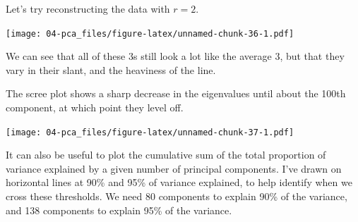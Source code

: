 \documentclass[]{book}
\newenvironment{Shaded}{\begin{snugshade}}{\end{snugshade}}
\newcommand{\CommentTok}[1]{\textcolor[rgb]{0.56,0.35,0.01}{\textit{#1}}}
\newcommand{\DataTypeTok}[1]{\textcolor[rgb]{0.13,0.29,0.53}{#1}}
\newcommand{\DecValTok}[1]{\textcolor[rgb]{0.00,0.00,0.81}{#1}}
\newcommand{\KeywordTok}[1]{\textcolor[rgb]{0.13,0.29,0.53}{\textbf{#1}}}
\newcommand{\NormalTok}[1]{#1}
\newcommand{\OperatorTok}[1]{\textcolor[rgb]{0.81,0.36,0.00}{\textbf{#1}}}
\newcommand{\StringTok}[1]{\textcolor[rgb]{0.31,0.60,0.02}{#1}}
\theoremstyle{definition}
\theoremstyle{definition}
\theoremstyle{definition}
\theoremstyle{remark}
\begin{document}
Let's try reconstructing the data with \(r=2\).

\begin{Shaded}
\end{Shaded}

\texttt{[image: 04-pca\_files/figure-latex/unnamed-chunk-36-1.pdf]}

We can see that all of these 3s still look a lot like the average 3, but that they vary in their slant, and the heaviness of the line.

The scree plot shows a sharp decrease in the eigenvalues until about the 100th component, at which point they level off.

\begin{Shaded}
\end{Shaded}

\texttt{[image: 04-pca\_files/figure-latex/unnamed-chunk-37-1.pdf]}

It can also be useful to plot the cumulative sum of the total proportion of variance explained by a given number of principal components. I've drawn on horizontal lines at 90\% and 95\% of variance explained, to help identify when we cross these thresholds.
We need 80 components to explain 90\% of the variance, and 138 components to explain 95\% of the variance.
\end{document}
